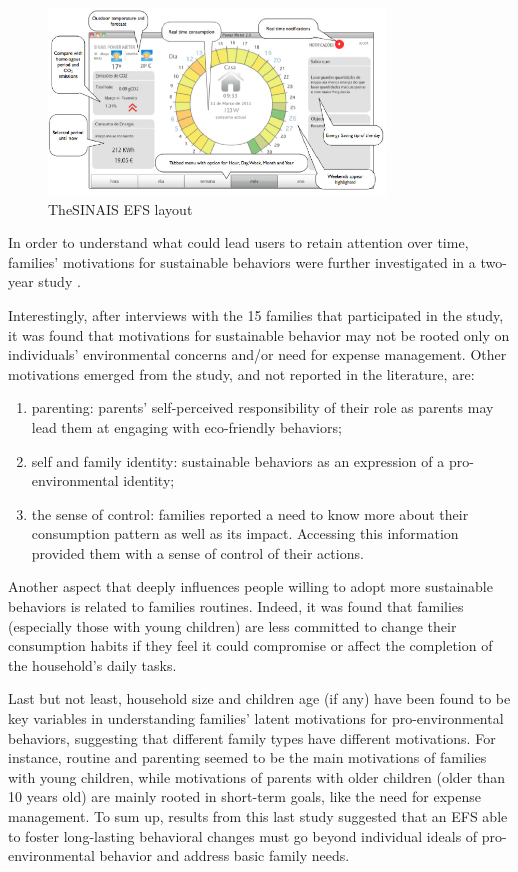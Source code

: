 \begin{figure}[h]
\centering
\includegraphics[width=0.8\textwidth]{./Images/efs1}
\caption{The\ac{SINAIS} \ac{EFS} layout}
\label{fig:efs1}
\end{figure}


In order to understand what could lead users to retain attention over time, families’ motivations for sustainable behaviors were further investigated in a two-year study \cite{Barreto2014}.


Interestingly, after interviews with the 15 families that participated in the study, it was found that motivations for sustainable behavior may not be rooted only on individuals’ environmental concerns and/or need for expense management. Other motivations emerged from the study, and not reported in the literature, are:

\begin{enumerate}
    \item parenting: parents’ self-perceived responsibility of their role as parents may lead them at engaging with eco-friendly behaviors;
    \item self and family identity: sustainable behaviors as an expression of a pro-environmental identity;
    \item the sense of control: families reported a need to know more about their consumption pattern as well as its impact. Accessing this information provided them with a sense of control of their actions.
\end{enumerate}

Another aspect that deeply influences people willing to adopt more sustainable behaviors  is related to families routines. Indeed, it was found that families (especially those with young children) are less committed to change their consumption habits if they feel it could compromise or affect the completion of the household’s daily tasks. 


Last but not least, household size and children age (if any) have been found to be key variables in understanding families’ latent motivations for pro-environmental behaviors, suggesting that different family types have different motivations. For instance, routine and parenting seemed to be the main motivations of families with young children, while motivations of parents with older children (older than 10 years old) are mainly rooted in short-term goals, like the need for expense management. To sum up, results from this last study suggested that an EFS able to foster long-lasting behavioral changes must go beyond individual ideals of pro-environmental behavior and address basic family needs.


